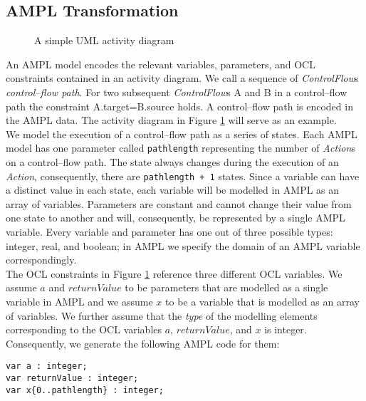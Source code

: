\documentclass[runningheads,a4paper]{llncs}%
\newcommand{\UMLType}[1]{\textsf{\textit{#1}}} %
\newcommand{\UMLReference}[1]{\textsf{\textit{#1}}} %
\newcommand{\AMPLCode}[1]{\texttt{#1}}
\begin{document}
\subsection{AMPL Transformation}%
\label{sec:AMPLTransformation}%
\begin{figure}%
\def\svgwidth{\textwidth}%
\graphicspath{{./pics/}}%
%
\caption{A simple UML activity diagram}%
\label{fig:AssignmentDecision}%
\end{figure}%
An AMPL model encodes the relevant variables, parameters, and OCL constraints contained in an activity diagram. We call a sequence of \UMLReference{ControlFlow}s \emph{control--flow path}. For two subsequent \UMLType{ControlFlow}s A and B in a control--flow path the constraint A.target=B.source holds. A control--flow path is encoded in the AMPL data. The activity diagram in Figure \ref{fig:AssignmentDecision} will serve as an example.\\%
We model the execution of a control--flow path as a series of states. Each AMPL model has one parameter called \AMPLCode{pathlength} representing the number of \UMLType{Action}s on a control--flow path. The state always changes during the execution of an \UMLType{Action}, consequently, there are \AMPLCode{pathlength + 1} states. Since a variable can have a distinct value in each state, each variable will be modelled in AMPL as an array of variables. Parameters are constant and cannot change their value from one state to another and will, consequently, be represented by a single AMPL variable. Every variable and parameter has one out of three possible types: integer, real, and boolean; in AMPL we specify the domain of an AMPL variable correspondingly.\\%
The OCL constraints in Figure \ref{fig:AssignmentDecision} reference three different OCL variables. We assume $a$ and $returnValue$ to be parameters that are modelled as a single variable in AMPL and we assume $x$ to be a variable that is modelled as an array of variables. We further assume that the \UMLReference{type} of the modelling elements corresponding to the OCL variables $a$, ${returnValue}$, and $x$ is integer. Consequently, we generate the following AMPL code for them: %
\begin{lstlisting}[basicstyle=\ttfamily,language=ampl]
var a : integer;
var returnValue : integer;
var x{0..pathlength} : integer;
\end{lstlisting}%
\end{document}
